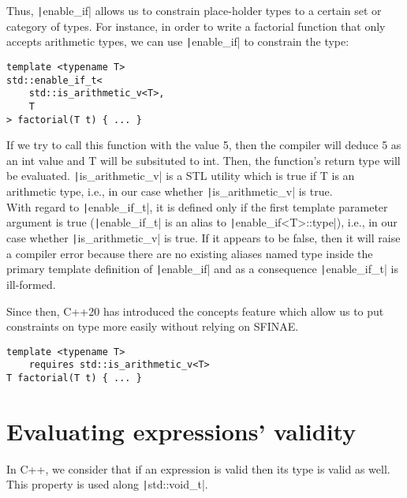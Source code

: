 
Thus, \texttt|enable_if| allows us to constrain place-holder types to a certain set or category of types. For instance, in order to write a factorial function that only accepts arithmetic types, we can use \texttt|enable_if| to constrain the type:

\begin{verbatim}
template <typename T>
std::enable_if_t<
    std::is_arithmetic_v<T>, 
    T
> factorial(T t) { ... }
\end{verbatim}

If we try to call this function with the value 5, then the compiler will deduce 5 as an int value and T will be subsituted to int. Then, the function's return type will be evaluated. \texttt|is_arithmetic_v| is a STL utility which is true if T is an arithmetic type, i.e., in our case whether \texttt|is_arithmetic_v| is true. \\

With regard to \texttt|enable_if_t|, it is defined only if the first template parameter argument is true (\texttt|enable_if_t| is an alias to \texttt|enable_if<T>::type|), i.e., in our case whether \texttt|is_arithmetic_v| is true. If it appears to be false, then it will raise a compiler error because there are no existing aliases named type inside the primary template definition of \texttt|enable_if| and as a consequence \texttt|enable_if_t| is ill-formed.

\begin{paracol}{2}
Since then, C++20 has introduced the concepts feature which allow us to put constraints on type more easily without relying on SFINAE.

\switchcolumn

\begin{verbatim}
template <typename T>
    requires std::is_arithmetic_v<T>
T factorial(T t) { ... }
\end{verbatim}
\end{paracol}

\section*{Evaluating expressions' validity}

In C++, we consider that if an expression is valid then its type is valid as well. This property is used along \texttt|std::void_t|.

